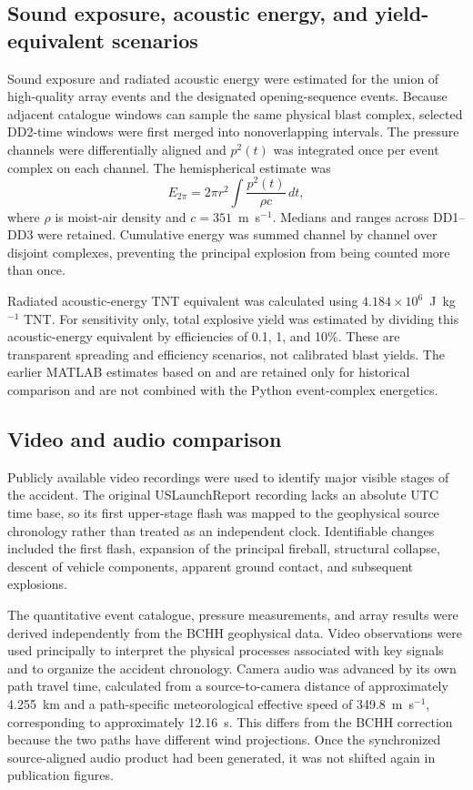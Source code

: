 \documentclass[]{seismica}
\begin{document}
\subsection{Sound exposure, acoustic energy, and yield-equivalent scenarios}

Sound exposure and radiated acoustic energy were estimated for the union of
high-quality array events and the designated opening-sequence events. Because adjacent catalogue
windows can sample the same physical blast complex, selected DD2-time windows
were first merged into nonoverlapping intervals. The pressure channels were
differentially aligned and $p^2(t)$ was integrated once per event complex on
each channel. The hemispherical estimate was
\begin{equation}
  E_{2\pi}=2\pi r^2\int\frac{p^2(t)}{\rho c}\,dt,
  \label{eq:acoustic_energy}
\end{equation}
where $\rho$ is moist-air density and $c=351$~m~s$^{-1}$. Medians and ranges
across DD1--DD3 were retained. Cumulative energy was summed channel by channel
over disjoint complexes, preventing the principal explosion from being counted
more than once.

Radiated acoustic-energy TNT equivalent was calculated using
$4.184\times10^6$~J~kg$^{-1}$ TNT. For sensitivity only, total explosive yield
was estimated by dividing this acoustic-energy equivalent by efficiencies of
0.1, 1, and 10\%. These are transparent spreading and efficiency scenarios,
not calibrated blast yields. The earlier MATLAB estimates based on
\citet{johnson_aster_2005} and \citet{kanamori_1977} are retained only for
historical comparison and are not combined with the Python event-complex
energetics.

\subsection{Video and audio comparison}

Publicly available video recordings were used to identify major visible stages
of the accident. The original USLaunchReport recording
\citep{uslaunchreport_amos6_video_2016} lacks an absolute UTC time base, so
its first upper-stage flash was mapped to the geophysical source chronology
rather than treated as an independent clock. Identifiable changes included the
first flash, expansion of the principal fireball, structural collapse, descent
of vehicle components, apparent ground contact, and subsequent explosions.

The quantitative event catalogue, pressure measurements, and array results were
derived independently from the BCHH geophysical data. Video observations were
used principally to interpret the physical processes associated with key
signals and to organize the accident chronology. Camera audio was advanced by
its own path travel time, calculated from a source-to-camera distance of
approximately 4.255~km and a path-specific meteorological effective speed of
349.8~m~s$^{-1}$, corresponding to approximately 12.16~s. This differs from
the BCHH correction because the two paths have different wind projections.
Once the synchronized source-aligned audio product had been generated, it was
not shifted again in publication figures.
\end{document}
